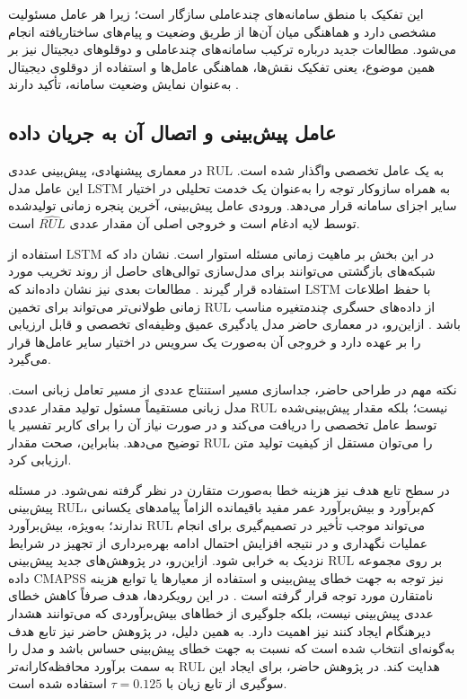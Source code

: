 \documentclass[a4paper,fleqn]{report}
\begin{document}
این تفکیک با منطق سامانه‌های چندعاملی سازگار است؛ زیرا هر عامل
مسئولیت مشخصی دارد و هماهنگی میان آن‌ها از طریق وضعیت و پیام‌های
ساختاریافته انجام می‌شود. مطالعات جدید درباره ترکیب سامانه‌های
چندعاملی و دوقلوهای دیجیتال نیز بر همین موضوع، یعنی تفکیک نقش‌ها،
هماهنگی عامل‌ها و استفاده از دوقلوی دیجیتال به‌عنوان نمایش وضعیت سامانه،
تأکید دارند \cite{lopez2024madtwin,pretel2022masdt}.

\subsection{عامل پیش‌بینی و اتصال آن به جریان داده}
\label{sec:cmapss-prediction-agent}

در معماری پیشنهادی، پیش‌بینی عددی \gls{RUL} به یک عامل تخصصی
واگذار شده است. این عامل مدل \gls{LSTM} به همراه سازوکار توجه را
به‌عنوان یک خدمت تحلیلی در اختیار سایر اجزای سامانه قرار می‌دهد.
ورودی عامل پیش‌بینی، آخرین پنجره زمانی تولیدشده توسط لایه ادغام
است و خروجی اصلی آن مقدار عددی $\widehat{RUL}$ است.

استفاده از \gls{LSTM} در این بخش بر ماهیت زمانی مسئله استوار است.
 نشان داد که شبکه‌های بازگشتی می‌توانند برای مدل‌سازی
توالی‌های حاصل از روند تخریب مورد استفاده قرار گیرند
\cite{heimes2008recurrent}.
 مطالعات بعدی نیز نشان داده‌اند که LSTM با
حفظ اطلاعات زمانی طولانی‌تر می‌تواند برای تخمین \gls{RUL} از
داده‌های حسگری چندمتغیره مناسب باشد \cite{heimes2008recurrent}.
ازاین‌رو، در معماری حاضر مدل یادگیری عمیق وظیفه‌ای تخصصی و
قابل ارزیابی را بر عهده دارد و خروجی آن به‌صورت یک سرویس در
اختیار سایر عامل‌ها قرار می‌گیرد.

نکته مهم در طراحی حاضر، جداسازی مسیر استنتاج عددی از مسیر
تعامل زبانی است. مدل زبانی مستقیماً مسئول تولید مقدار عددی
\gls{RUL} نیست؛ بلکه مقدار پیش‌بینی‌شده توسط عامل تخصصی را
دریافت می‌کند و در صورت نیاز آن را برای کاربر تفسیر یا توضیح
می‌دهد. بنابراین، صحت مقدار \gls{RUL} را می‌توان مستقل از کیفیت
تولید متن ارزیابی کرد.

در سطح تابع هدف نیز هزینه خطا به‌صورت متقارن در نظر گرفته
نمی‌شود. در مسئله پیش‌بینی \gls{RUL}، کم‌برآورد و بیش‌برآورد عمر
مفید باقیمانده الزاماً پیامدهای یکسانی ندارند؛ به‌ویژه، بیش‌برآورد
\gls{RUL} می‌تواند موجب تأخیر در تصمیم‌گیری برای انجام عملیات
نگهداری و در نتیجه افزایش احتمال ادامه بهره‌برداری از تجهیز در
شرایط نزدیک به خرابی شود. ازاین‌رو، در پژوهش‌های جدید پیش‌بینی
\gls{RUL} بر روی مجموعه داده \gls{CMAPSS} نیز توجه به جهت خطای
پیش‌بینی و استفاده از معیارها یا توابع هزینه نامتقارن مورد توجه
قرار گرفته است \cite{he2025bilstmgru,zhang2026multistatistic,dong2026bidirectional}. 
در این رویکردها، هدف صرفاً کاهش خطای عددی پیش‌بینی نیست، بلکه
جلوگیری از خطاهای بیش‌برآوردی که می‌توانند هشدار دیرهنگام ایجاد
کنند نیز اهمیت دارد. به همین دلیل، در پژوهش حاضر نیز تابع هدف
به‌گونه‌ای انتخاب شده است که نسبت به جهت خطای پیش‌بینی حساس باشد
و مدل را به سمت برآورد محافظه‌کارانه‌تر \gls{RUL} هدایت کند. در پژوهش حاضر، برای ایجاد
این سوگیری از تابع زیان  با
$\tau=0.125$ استفاده شده است.
\end{document}
